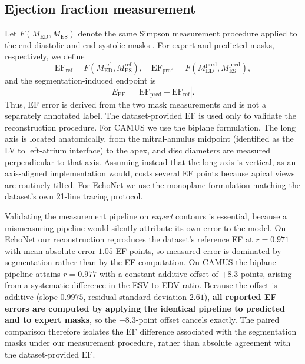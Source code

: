\documentclass[conference,a4paper]{IEEEtran}
\begin{document}
\subsection{Ejection fraction measurement}
Let $F(M_{\mathrm{ED}},M_{\mathrm{ES}})$ denote the same Simpson measurement procedure
applied to the end-diastolic and end-systolic masks \cite{lang2015}. For expert and
predicted masks, respectively, we define
\begin{equation}
\mathrm{EF}_{\mathrm{ref}} = F(M^{\mathrm{ref}}_{\mathrm{ED}},M^{\mathrm{ref}}_{\mathrm{ES}}),
\quad
\mathrm{EF}_{\mathrm{pred}} = F(M^{\mathrm{pred}}_{\mathrm{ED}},M^{\mathrm{pred}}_{\mathrm{ES}}),
\end{equation}
and the segmentation-induced endpoint is
\begin{equation}
E_{\mathrm{EF}} = \left|\mathrm{EF}_{\mathrm{pred}}-\mathrm{EF}_{\mathrm{ref}}\right|.
\end{equation}
Thus, EF error is derived from the two mask measurements and is not a separately
annotated label. The dataset-provided EF is used only to validate the reconstruction
procedure. For
CAMUS we use the biplane formulation. The long axis is located anatomically, from the
mitral-annulus midpoint (identified as the LV to left-atrium interface) to the apex, and
disc diameters are measured perpendicular to that axis. Assuming instead that the long axis
is vertical, as an axis-aligned implementation would, costs several EF points because
apical views are routinely tilted. For EchoNet we use the monoplane formulation matching
the dataset's own 21-line tracing protocol.

Validating the measurement pipeline on \emph{expert} contours is essential, because a
mismeasuring pipeline would silently attribute its own error to the model. On EchoNet our
reconstruction reproduces the dataset's reference EF at $r = 0.971$ with mean absolute
error $1.05$ EF points, so measured error is dominated by segmentation rather than by the
EF computation. On CAMUS the biplane pipeline attains $r = 0.977$ with a constant additive
offset of $+8.3$ points, arising from a systematic difference in the ESV to EDV ratio.
Because the offset is additive (slope $0.9975$, residual standard deviation $2.61$),
\textbf{all reported EF errors are computed by applying the identical pipeline to predicted
and to expert masks}, so the $+8.3$-point offset cancels exactly. The paired comparison
therefore isolates the EF difference associated with the segmentation masks under our
measurement procedure, rather than absolute agreement with the dataset-provided EF.
\end{document}
